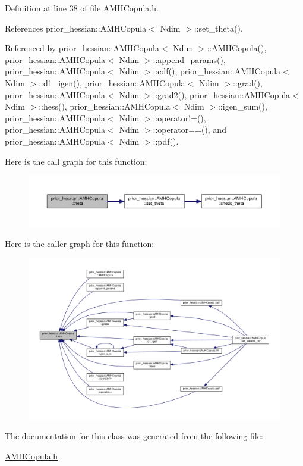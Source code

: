 Definition at line 38 of file A\+M\+H\+Copula.\+h.



References prior\+\_\+hessian\+::\+A\+M\+H\+Copula$<$ Ndim $>$\+::set\+\_\+theta().



Referenced by prior\+\_\+hessian\+::\+A\+M\+H\+Copula$<$ Ndim $>$\+::\+A\+M\+H\+Copula(), prior\+\_\+hessian\+::\+A\+M\+H\+Copula$<$ Ndim $>$\+::append\+\_\+params(), prior\+\_\+hessian\+::\+A\+M\+H\+Copula$<$ Ndim $>$\+::cdf(), prior\+\_\+hessian\+::\+A\+M\+H\+Copula$<$ Ndim $>$\+::d1\+\_\+igen(), prior\+\_\+hessian\+::\+A\+M\+H\+Copula$<$ Ndim $>$\+::grad(), prior\+\_\+hessian\+::\+A\+M\+H\+Copula$<$ Ndim $>$\+::grad2(), prior\+\_\+hessian\+::\+A\+M\+H\+Copula$<$ Ndim $>$\+::hess(), prior\+\_\+hessian\+::\+A\+M\+H\+Copula$<$ Ndim $>$\+::igen\+\_\+sum(), prior\+\_\+hessian\+::\+A\+M\+H\+Copula$<$ Ndim $>$\+::operator!=(), prior\+\_\+hessian\+::\+A\+M\+H\+Copula$<$ Ndim $>$\+::operator==(), and prior\+\_\+hessian\+::\+A\+M\+H\+Copula$<$ Ndim $>$\+::pdf().



Here is the call graph for this function\+:\nopagebreak
\begin{figure}[H]
\begin{center}
\leavevmode
\includegraphics[width=350pt]{classprior__hessian_1_1AMHCopula_a11696b4a8cef12a30706cd745820b201_cgraph}
\end{center}
\end{figure}




Here is the caller graph for this function\+:\nopagebreak
\begin{figure}[H]
\begin{center}
\leavevmode
\includegraphics[width=350pt]{classprior__hessian_1_1AMHCopula_a11696b4a8cef12a30706cd745820b201_icgraph}
\end{center}
\end{figure}




The documentation for this class was generated from the following file\+:\begin{DoxyCompactItemize}
\item 
\hyperlink{AMHCopula_8h}{A\+M\+H\+Copula.\+h}\end{DoxyCompactItemize}
